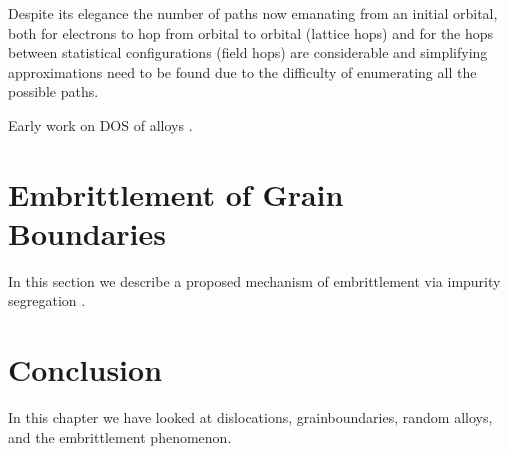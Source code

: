 Despite its elegance the number of paths now emanating from an initial orbital, both
for electrons to hop from orbital to orbital (lattice hops) and for the hops between 
statistical configurations (field hops) are considerable and simplifying approximations 
need to be found due to the difficulty of enumerating all the possible paths.

Early work on DOS of alloys \cite{cubiotti77}. 

\section{Embrittlement of Grain Boundaries}
In this section we describe a proposed mechanism of embrittlement via impurity
segregation \cite{haydock82}.

\section{Conclusion}
In this chapter we have looked at dislocations, grainboundaries, random alloys, and the embrittlement
phenomenon.


